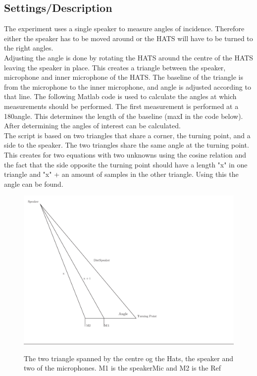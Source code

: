 \subsection{Settings/Description}
The experiment uses a single speaker to measure angles of incidence. Therefore either the speaker has to be moved around or the HATS will have to be turned to the right angles. \\
Adjusting the angle is done by rotating the HATS around the centre of the HATS leaving the speaker in place. This creates a triangle between the speaker, microphone and inner microphone of the HATS. The baseline of the triangle is from the microphone to the inner microphone, and angle is adjusted according to that line. 
The following Matlab code is used to calculate the angles at which measurements should be performed. The first measurement is performed at a 180\textdegree angle. This determines the length of the baseline (maxI in the code below). After determining the angles of interest can be calculated.  \\
The script is based on two triangles that share a corner, the turning point, and a side to the speaker. The two triangles share the same angle at the turning point. This creates for two equations with two unknowns using the cosine relation and the fact that the side opposite the turning point should have a length "x" in one triangle and "x" + an amount of samples in the other triangle. Using this the angle can  be found.

\begin{figure}
	\includegraphics[width=\textwidth]{../Journal/Experiments/AngleOfIncidence/TriangleCalculation.pdf}
	\label{Fig:AngleOfIcidenceTriangleCalculation}
	\caption{The two triangle spanned by the centre og the Hats, the speaker and two of the microphones. M1 is the speakerMic and M2 is the Ref}
\end{figure}  

